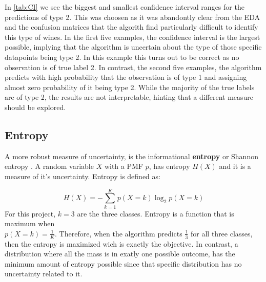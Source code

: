 \documentclass[11pt,twoside]{article}
\numberwithin{Theorem}{section}
\numberwithin{Definition}{section}
\numberwithin{Lemma}{section}
\numberwithin{Algorithm}{section}
\numberwithin{equation}{section}
\begin{document}
In \autoref{tab:CI} we see the biggest and smallest confidence interval ranges for the predictions of \textsf{type 2}. This was choosen as it was abandontly clear from the EDA and the confusion matrices that the algorith find particularly difficult to identify this type of wines. In the first five examples, the confidence interval is the largest possible, implying that the algorithm is uncertain about the type of those specific datapoints being \textsf{type 2}. In this example this turns out to be correct as no observation is of true label 2. In contrast, the second five examples, the algorithm predicts with high probability that the observation is of \textsf{type 1} and assigning almost zero probability of it being \textsf{type 2}. While the majority of the true labels are of \textsf{type 2}, the results are not interpretable, hinting that a different measure should be explored.

\subsection{Entropy}
A more robust measure of uncertainty, is the informational \textbf{entropy} or Shannon entropy \cite{shannon}. A random variable $X$ with a PMF $p$, has entropy $H(X)$ and it is a measure of it's uncertainty. Entropy is defined as:

\begin{equation}
H(X) = - \sum_{k=1}^K p(X=k) \log_2p(X=k)
\end{equation}
For this project, $k=3$ are the three classes. Entropy is a function that is maximum when \\
$p(X=k) = \frac{1}{K}$. Therefore, when the algorithm predicts $\frac{1}{3}$ for all three classes, then the entropy is maximized wich is exactly the objective. In contrast, a distribution where all the mass is in exatly one possible outcome, has the minimum amount of entropy possible since that specific distribution has no uncertainty related to it.
\end{document}
